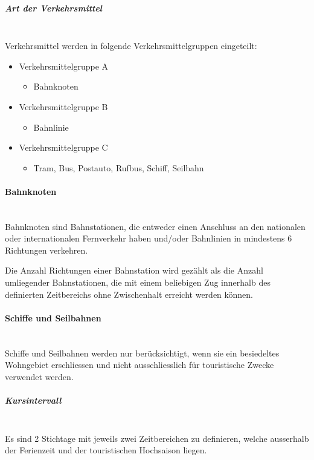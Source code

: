 \subparagraph{Art der Verkehrsmittel}~\\
\label{Berechnungsmethodik OeVGK18:Art der Verkehrsmittel}
Verkehrsmittel werden in folgende Verkehrsmittelgruppen eingeteilt:

\begin{itemize}[noitemsep]
    \item Verkehrsmittelgruppe A
    \begin{itemize}
        \item Bahnknoten
    \end{itemize}
    \item Verkehrsmittelgruppe B
    \begin{itemize}
        \item Bahnlinie
    \end{itemize}
    \item Verkehrsmittelgruppe C
    \begin{itemize}
        \item Tram, Bus, Postauto, Rufbus, Schiff, Seilbahn
    \end{itemize}
\end{itemize}

\paragraph{Bahnknoten}~\\
Bahnknoten sind Bahnstationen, die entweder einen Anschluss an den nationalen oder internationalen Fernverkehr haben und/oder Bahnlinien in mindestens 6 Richtungen verkehren.

Die Anzahl Richtungen einer Bahnstation wird gezählt als die Anzahl umliegender Bahnstationen, die mit einem beliebigen Zug innerhalb des definierten Zeitbereichs ohne Zwischenhalt erreicht werden können.

\paragraph{Schiffe und Seilbahnen}~\\
Schiffe und Seilbahnen werden nur berücksichtigt, wenn sie ein besiedeltes Wohngebiet erschliessen und nicht ausschliesslich für touristische Zwecke verwendet werden.


\subparagraph{Kursintervall}~\\
\label{Berechnungsmethodik OeVGK18:Kursintervall}
Es sind 2 Stichtage mit jeweils zwei Zeitbereichen zu definieren, welche ausserhalb der Ferienzeit und der touristischen Hochsaison liegen.

